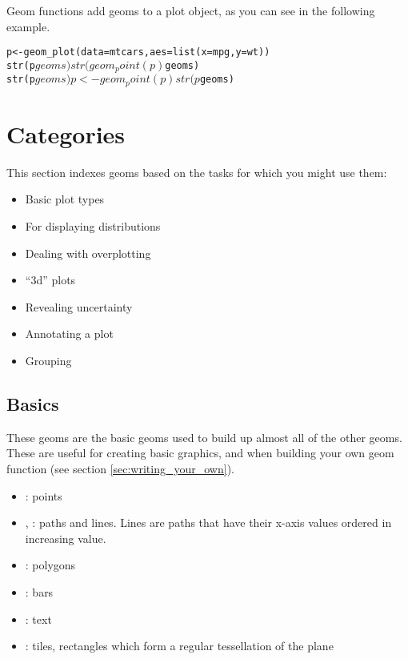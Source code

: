 Geom functions add geoms to a plot object, as you can see in the following example.

\begin{alltt}
p <- geom_plot(data=mtcars, aes=list(x=mpg, y=wt))
str(p$geoms) 
str(geom_point(p)$geoms)
str(p$geoms)
p <- geom_point(p)
str(p$geoms)
\end{alltt}

\section{Categories}\label{sec:categories}

This section indexes geoms based on the tasks for which you might use them: 

\begin{itemize}
	\item Basic plot types
	\item For displaying distributions
	\item Dealing with overplotting
	\item ``3d'' plots
	\item Revealing uncertainty
	\item Annotating a plot
	\item Grouping
\end{itemize}


\subsection{Basics}\label{sub:basics}

These geoms are the basic geoms used to build up almost all of the other geoms.  These are useful for creating basic graphics, and when building your own geom function (see section \ref{sec:writing_your_own}).

\begin{itemize}
  \item {}: points
  \item {}, : paths and lines.  Lines are paths that have their x-axis values ordered in increasing value.
  \item {}: polygons
  \item {}: bars
  \item {}: text
  \item {}: tiles, rectangles which form a regular tessellation of the plane
\end{itemize}

